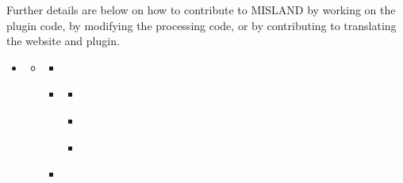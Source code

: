 \documentclass[letterpaper,10pt,english]{sphinxmanual}
\begin{document}
\sphinxAtStartPar
Further details are below on how to contribute to MISLAND by working on
the plugin code, by modifying the processing code, or by contributing to
translating the website and plugin.

\begin{sphinxShadowBox}
\begin{itemize}
\item {} 
\sphinxAtStartPar
{}\label{\detokenize{Qgis_Plugin/plugin_development:id5}}{\hyperref[\detokenize{Qgis_Plugin/plugin_development:plugin-development}]{}}
\begin{itemize}
\item {} 
\sphinxAtStartPar
{}\label{\detokenize{Qgis_Plugin/plugin_development:id6}}{\hyperref[\detokenize{Qgis_Plugin/plugin_development:modifying-the-qgis-plugin-code}]{}}
\begin{itemize}
\item {} 
\sphinxAtStartPar
{}\label{\detokenize{Qgis_Plugin/plugin_development:id7}}{\hyperref[\detokenize{Qgis_Plugin/plugin_development:downloading-the-misland-code}]{}}

\item {} 
\sphinxAtStartPar
{}\label{\detokenize{Qgis_Plugin/plugin_development:id8}}{\hyperref[\detokenize{Qgis_Plugin/plugin_development:installing-dependencies}]{}}
\begin{itemize}
\item {} 
\sphinxAtStartPar
{}\label{\detokenize{Qgis_Plugin/plugin_development:id9}}{\hyperref[\detokenize{Qgis_Plugin/plugin_development:python}]{}}

\item {} 
\sphinxAtStartPar
{}\label{\detokenize{Qgis_Plugin/plugin_development:id10}}{\hyperref[\detokenize{Qgis_Plugin/plugin_development:python-dependencies}]{}}

\item {} 
\sphinxAtStartPar
{}\label{\detokenize{Qgis_Plugin/plugin_development:id11}}{\hyperref[\detokenize{Qgis_Plugin/plugin_development:pyqt}]{}}

\end{itemize}

\item {} 
\sphinxAtStartPar
{}\label{\detokenize{Qgis_Plugin/plugin_development:id12}}{\hyperref[\detokenize{Qgis_Plugin/plugin_development:changing-the-version-of-the-plugin}]{}}


\end{itemize}
\end{itemize}
\end{itemize}
\end{sphinxShadowBox}
\end{document}

